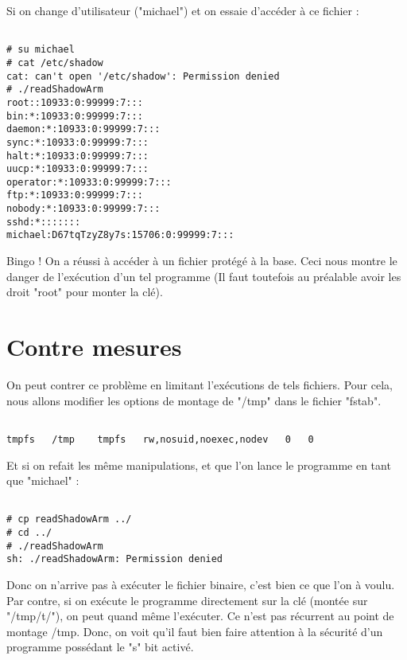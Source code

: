 Si on change d'utilisateur ("michael") et on essaie d'accéder à ce fichier :
\begin{lstlisting}[frame=single,style=Bash]  % Start your code-block

# su michael
# cat /etc/shadow
cat: can't open '/etc/shadow': Permission denied
# ./readShadowArm
root::10933:0:99999:7:::
bin:*:10933:0:99999:7:::
daemon:*:10933:0:99999:7:::
sync:*:10933:0:99999:7:::
halt:*:10933:0:99999:7:::
uucp:*:10933:0:99999:7:::
operator:*:10933:0:99999:7:::
ftp:*:10933:0:99999:7:::
nobody:*:10933:0:99999:7:::
sshd:*:::::::
michael:D67tqTzyZ8y7s:15706:0:99999:7:::

\end{lstlisting}

Bingo ! On a réussi à accéder à un fichier protégé à la base. Ceci nous montre le danger de l'exécution d'un tel programme (Il faut toutefois au préalable avoir les droit "root" pour monter la clé).

\pagebreak
\section{Contre mesures}
On peut contrer ce problème en limitant l'exécutions de tels fichiers. Pour cela, nous allons modifier les options de montage de "/tmp" dans le fichier "fstab".

\begin{lstlisting}[frame=single,style=Bash]  % Start your code-block

tmpfs   /tmp    tmpfs   rw,nosuid,noexec,nodev   0   0
\end{lstlisting}

Et si on refait les même manipulations, et que l'on lance le programme en tant que "michael" :
\begin{lstlisting}[frame=single,style=Bash]  % Start your code-block

# cp readShadowArm ../
# cd ../
# ./readShadowArm 
sh: ./readShadowArm: Permission denied
\end{lstlisting}

Donc on n'arrive pas à exécuter le fichier binaire, c'est bien ce que l'on à voulu. Par contre, si on exécute le programme directement sur la clé (montée sur "/tmp/t/"), on peut quand même l'exécuter. Ce n'est pas récurrent au point de montage /tmp. Donc, on voit qu'il faut bien faire attention à la sécurité d'un programme possédant le "s" bit activé.
